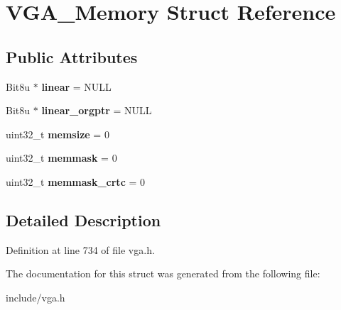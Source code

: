 \hypertarget{structVGA__Memory}{\section{V\-G\-A\-\_\-\-Memory Struct Reference}
\label{structVGA__Memory}
}
\subsection*{Public Attributes}
\begin{DoxyCompactItemize}
\item 
\hypertarget{structVGA__Memory_ad97ba657c0183be121936eeb11436171}{Bit8u $\ast$ {\bfseries linear} = N\-U\-L\-L}\label{structVGA__Memory_ad97ba657c0183be121936eeb11436171}

\item 
\hypertarget{structVGA__Memory_a8b4dbdb74bb5fe961f686c16cae8a11c}{Bit8u $\ast$ {\bfseries linear\-\_\-orgptr} = N\-U\-L\-L}\label{structVGA__Memory_a8b4dbdb74bb5fe961f686c16cae8a11c}

\item 
\hypertarget{structVGA__Memory_aa7ab72d06d3ddb3a945f307865b8d902}{uint32\-\_\-t {\bfseries memsize} = 0}\label{structVGA__Memory_aa7ab72d06d3ddb3a945f307865b8d902}

\item 
\hypertarget{structVGA__Memory_abdbc1c51a3263d179ee67dc7482bf339}{uint32\-\_\-t {\bfseries memmask} = 0}\label{structVGA__Memory_abdbc1c51a3263d179ee67dc7482bf339}

\item 
\hypertarget{structVGA__Memory_ac09f53aaff79d38b002bcf28d04009de}{uint32\-\_\-t {\bfseries memmask\-\_\-crtc} = 0}\label{structVGA__Memory_ac09f53aaff79d38b002bcf28d04009de}

\end{DoxyCompactItemize}


\subsection{Detailed Description}


Definition at line 734 of file vga.\-h.



The documentation for this struct was generated from the following file\-:\begin{DoxyCompactItemize}
\item 
include/vga.\-h\end{DoxyCompactItemize}
